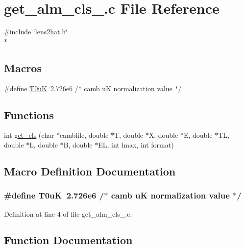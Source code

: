 \section{get\-\_\-alm\-\_\-cls\-\_.\-c File Reference}
\label{get__alm__cls__20121302_8c}
{\ttfamily \#include \char`\"{}lens2hat.\-h\char`\"{}}\\*
\subsection*{Macros}
\begin{DoxyCompactItemize}
\item 
\#define \hyperlink{get__alm__cls__20121302_8c_a08cd9bfd4b050dde02e833f33461b671}{T0u\-K}~2.\-726e6           /$\ast$ camb u\-K normalization value $\ast$/
\end{DoxyCompactItemize}
\subsection*{Functions}
\begin{DoxyCompactItemize}
\item 
int \hyperlink{get__alm__cls__20121302_8c_aa62c73b736317bf376f240cdc2d646f4}{get\-\_\-cls} (char $\ast$cambfile, double $\ast$T, double $\ast$X, double $\ast$E, double $\ast$T\-L, double $\ast$L, double $\ast$B, double $\ast$E\-L, int lmax, int format)
\end{DoxyCompactItemize}


\subsection{Macro Definition Documentation}
\subsubsection[{T0u\-K}]{\setlength{\rightskip}{0pt plus 5cm}\#define T0u\-K~2.\-726e6           /$\ast$ camb u\-K normalization value $\ast$/}\label{get__alm__cls__20121302_8c_a08cd9bfd4b050dde02e833f33461b671}


Definition at line 4 of file get\-\_\-alm\-\_\-cls\-\_.\-c.



\subsection{Function Documentation}
